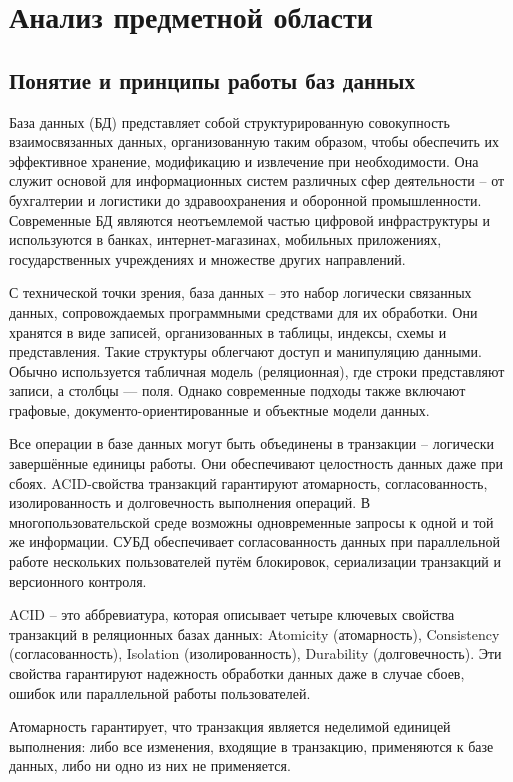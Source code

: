 \section{Анализ предметной области}
\subsection{Понятие и принципы работы баз данных}

База данных (БД) представляет собой структурированную совокупность взаимосвязанных данных, организованную таким образом, чтобы обеспечить их эффективное хранение, модификацию и извлечение при необходимости. Она служит основой для информационных систем различных сфер деятельности -- от бухгалтерии и логистики до здравоохранения и оборонной промышленности. Современные БД являются неотъемлемой частью цифровой инфраструктуры и используются в банках, интернет-магазинах, мобильных приложениях, государственных учреждениях и множестве других направлений.

С технической точки зрения, база данных -- это набор логически связанных данных, сопровождаемых программными средствами для их обработки. Они хранятся в виде записей, организованных в таблицы, индексы, схемы и представления. Такие структуры облегчают доступ и манипуляцию данными.	Обычно используется табличная модель (реляционная), где строки представляют записи, а столбцы — поля. Однако современные подходы также включают графовые, документо-ориентированные и объектные модели данных.
		
Все операции в базе данных могут быть объединены в транзакции -- логически завершённые единицы работы. Они обеспечивают целостность данных даже при сбоях. ACID-свойства транзакций гарантируют атомарность, согласованность, изолированность и долговечность выполнения операций. В многопользовательской среде возможны одновременные запросы к одной и той же информации. СУБД обеспечивает согласованность данных при параллельной работе нескольких пользователей путём блокировок, сериализации транзакций и версионного контроля.

ACID -- это аббревиатура, которая описывает четыре ключевых свойства транзакций в реляционных базах данных: Atomicity (атомарность), Consistency (согласованность), Isolation (изолированность), Durability (долговечность). Эти свойства гарантируют надежность обработки данных даже в случае сбоев, ошибок или параллельной работы пользователей.

Атомарность гарантирует, что транзакция является неделимой единицей выполнения: либо все изменения, входящие в транзакцию, применяются к базе данных, либо ни одно из них не применяется.

